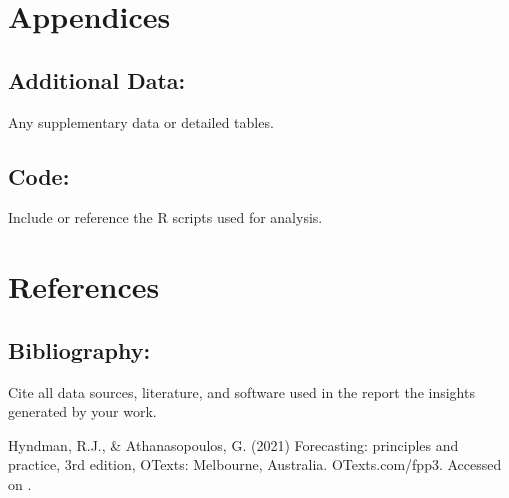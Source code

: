 \documentclass[11pt,a4paper,]{article}
\begin{document}
\section{Appendices}\label{appendices}

\subsection{Additional Data:}\label{additional-data}

Any supplementary data or detailed tables.

\subsection{Code:}\label{code}

Include or reference the R scripts used for analysis.

\section{References}\label{references}

\subsection{Bibliography:}\label{bibliography}

Cite all data sources, literature, and software used in the report the insights generated by your work.

Hyndman, R.J., \& Athanasopoulos, G. (2021) Forecasting: principles and practice, 3rd edition, OTexts: Melbourne, Australia. OTexts.com/fpp3. Accessed on .

\printbibliography
\end{document}
